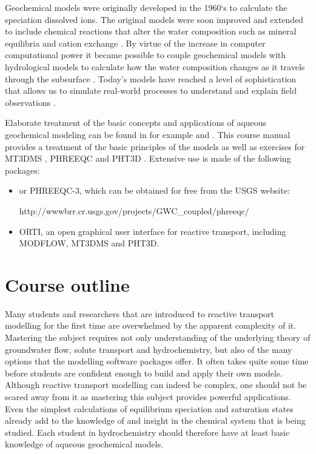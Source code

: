 Geochemical models were originally developed in the 1960`s to calculate the speciation dissolved ions. The original models were soon improved and extended to include chemical reactions that alter the water composition such as mineral equilibria and cation exchange \citep{plummer92}. By virtue of the increase in computer computational power it became possible to couple geochemical models with hydrological models to calculate how the water composition changes as it travels through the subsurface \citep{lichtner96}. Today's models have reached a level of sophistication that allows us to simulate real-world processes to understand and explain field observations \citep{lee_windt2001}. 

Elaborate treatment of the basic concepts and applications of aqueous geochemical modeling can be found in for example \citet{bethke1996} and \citet{lichtner96}. This course manual provides a treatment of the basic principles of the models as well as exercises for MT3DMS \citep{zheng99}, PHREEQC \citep{phreeqc2} and PHT3D \citep{prommer_gw}. Extensive use is made of the following packages:

\begin{itemize}

\item or PHREEQC-3, which can be obtained for free from the USGS website:

http://wwwbrr.cr.usgs.gov/projects/GWC\_coupled/phreeqc/

\item ORTI, an open graphical user interface for reactive transport, including MODFLOW, MT3DMS and PHT3D.

\end{itemize}

\section{Course outline}
Many students and researchers that are introduced to reactive transport modelling for the first time are overwhelmed by the apparent complexity of it. Mastering the subject requires not only understanding of the underlying theory of groundwater flow, solute transport and hydrochemistry, but also of the many options that the modelling software packages offer. It often takes quite some time before students are confident enough to build and apply their own models. Although reactive transport modelling can indeed be complex, one should not be scared away from it as mastering this subject provides powerful applications. Even the simplest calculations of equilibrium speciation and saturation states already add to the knowledge of and insight in the chemical system that is being studied. Each student in hydrochemistry should therefore have at least basic knowledge of aqueous geochemical models.

